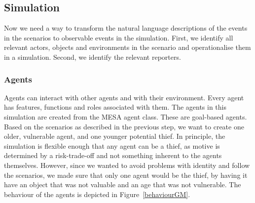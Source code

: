\documentclass[12pt]{article}
\begin{document}


\subsection{Simulation}		%

Now we need a way to transform the natural language descriptions of the events in the scenarios to observable events in the simulation. First, we identify all relevant actors, objects and environments in the scenario and operationalise them in a simulation. Second, we identify the relevant reporters. 



\subsubsection{Agents} 


Agents can interact with other agents and with their environment. Every agent has features, functions and roles associated with them. The agents in this simulation are created from the MESA agent class. These are goal-based agents.
Based on the scenarios as described in the previous step, we want to create one older, vulnerable agent, and one younger potential thief. In principle, the simulation is flexible enough that any agent can be a thief, as motive is determined by a risk-trade-off and not something inherent to the agents themselves. However, since we wanted to avoid problems with identity and follow the scenarios, we made sure that only one agent would be the thief, by having it have an object that was not valuable and an age that was not vulnerable. The behaviour of the agents is depicted in Figure~\ref{behaviourGM}.
\end{document}
